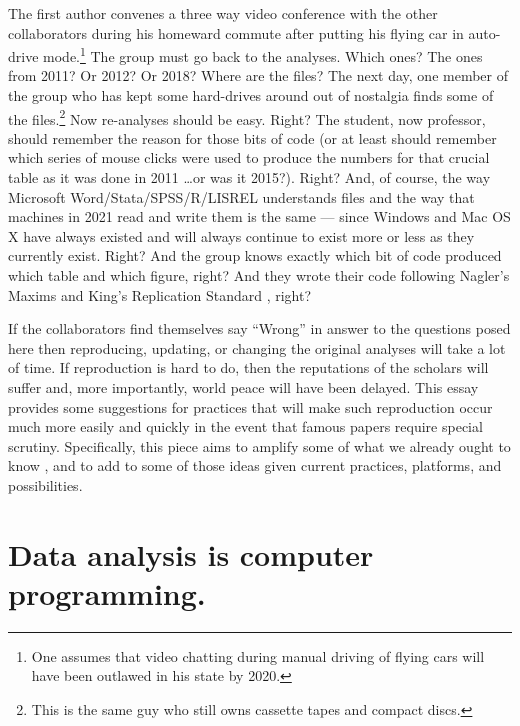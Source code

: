\documentclass[12pt]{article}
\begin{document}
The first author convenes a three way video conference with the other
collaborators during his homeward commute after putting his flying car
in auto-drive mode.\footnote{One assumes that video chatting during
  manual driving of flying cars will have been outlawed in his state
  by 2020.} The group must go back to the analyses. Which ones?  The
ones from 2011?  Or 2012? Or 2018? Where are the files? The next day,
one member of the group who has kept some hard-drives around out of
nostalgia finds some of the files.\footnote{This is the same guy who
  still owns cassette tapes and compact discs.} Now
re-analyses should be easy. Right? The student, now professor, should
remember the reason for those bits of code (or at least should
remember which series of mouse clicks were used to produce the numbers
for that crucial table as it was done in 2011 \ldots or was it
2015?). Right? And, of course, the way Microsoft
Word/Stata/SPSS/R/LISREL understands files and the way that 
machines in 2021 read and write them is the same --- since Windows and
Mac OS X have always existed and will always continue to exist more or
less as they currently exist. Right? And the group knows exactly which
bit of code produced which table and which figure, right? And they
wrote their code following Nagler's Maxims \citep{nagler1995coding}
and King's Replication Standard \citep{king1995replication}, right?

If the collaborators find themselves say ``Wrong'' in
answer to the questions posed here then reproducing, updating, or
changing the original analyses will take a lot of time. If
reproduction is hard to do, then the reputations of the scholars will
suffer and, more importantly, world peace will have been delayed. This
essay provides some suggestions for practices that will make such
reproduction occur much more easily and quickly in the event that
famous papers require special scrutiny. Specifically, this piece aims
to amplify some of what we already ought to know
\citep{king1995replication,nagler1995coding}, and to add to some of
those ideas given current practices, platforms, and possibilities.


\section{Data analysis is computer programming.}\label{sec:data-analys-comp}
\end{document}
